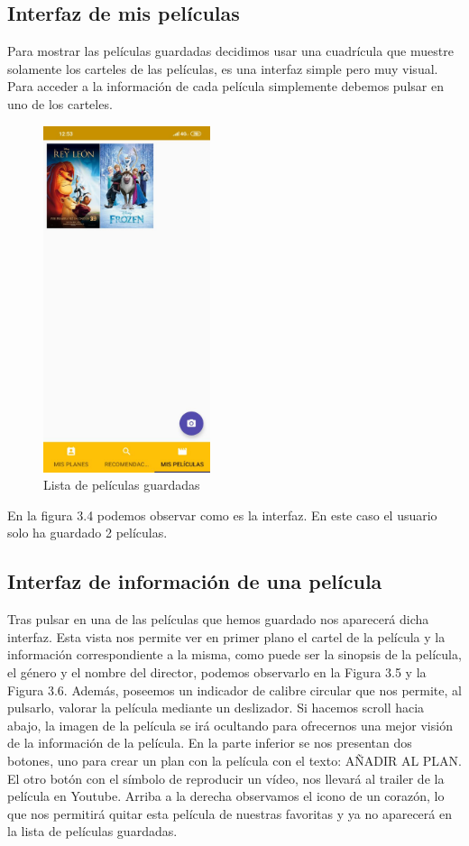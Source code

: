 \subsection{Interfaz de mis películas}
\label{makereference3.4.4}
Para mostrar las películas guardadas decidimos usar una cuadrícula que muestre solamente los carteles de las películas, es una interfaz simple pero muy visual. Para acceder a la información
de cada película simplemente debemos pulsar en uno de los carteles.
\begin{figure}[H]
    \centering
    \includegraphics[height=4in]{figures/FilmsList.jpg}
    \caption{Lista de películas guardadas}
\end{figure}
En la figura 3.4 podemos observar como es la interfaz. En este caso el usuario solo ha guardado 2 películas.
\subsection{Interfaz de información de una película}
\label{makereference3.4.5}

Tras pulsar en una de las películas que hemos guardado nos aparecerá dicha interfaz. 
Esta vista nos permite ver en primer plano el cartel de la película y la información correspondiente a la misma, como puede
ser la sinopsis de la película, el género y el nombre del director, podemos observarlo en la Figura 3.5 y la Figura 3.6. Además, poseemos un indicador de calibre circular que nos permite, al pulsarlo,
valorar la película mediante un deslizador.
Si hacemos scroll hacia abajo, la imagen de la película se irá ocultando para ofrecernos una mejor visión de la información de la película.
En la parte inferior se nos presentan dos botones, uno para crear un plan con la película con el texto: AÑADIR AL PLAN. El otro botón con el símbolo de reproducir un vídeo, nos llevará al trailer de la película en Youtube.
Arriba a la derecha observamos el icono de un corazón, lo que nos permitirá quitar esta película de nuestras favoritas y ya no aparecerá en la
lista de películas guardadas.


